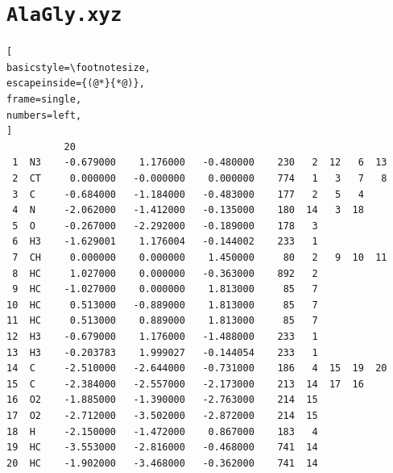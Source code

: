\documentclass[a4paper,11pt]{scrartcl}
\begin{document}
\printbibliography

\newpage

\appendix
\section{\texttt{AlaGly.xyz}}
\label{app:alaglytinker}
\begin{lstlisting}[
basicstyle=\footnotesize,
escapeinside={(@*}{*@)},
frame=single,
numbers=left,
]
          20  
 1  N3    -0.679000    1.176000   -0.480000    230   2  12   6  13
 2  CT     0.000000   -0.000000    0.000000    774   1   3   7   8
 3  C     -0.684000   -1.184000   -0.483000    177   2   5   4
 4  N     -2.062000   -1.412000   -0.135000    180  14   3  18
 5  O     -0.267000   -2.292000   -0.189000    178   3
 6  H3    -1.629001    1.176004   -0.144002    233   1
 7  CH     0.000000    0.000000    1.450000     80   2   9  10  11
 8  HC     1.027000    0.000000   -0.363000    892   2
 9  HC    -1.027000    0.000000    1.813000     85   7
10  HC     0.513000   -0.889000    1.813000     85   7
11  HC     0.513000    0.889000    1.813000     85   7
12  H3    -0.679000    1.176000   -1.488000    233   1
13  H3    -0.203783    1.999027   -0.144054    233   1
14  C     -2.510000   -2.644000   -0.731000    186   4  15  19  20
15  C     -2.384000   -2.557000   -2.173000    213  14  17  16
16  O2    -1.885000   -1.390000   -2.763000    214  15
17  O2    -2.712000   -3.502000   -2.872000    214  15
18  H     -2.150000   -1.472000    0.867000    183   4
19  HC    -3.553000   -2.816000   -0.468000    741  14
20  HC    -1.902000   -3.468000   -0.362000    741  14
\end{lstlisting}
\end{document}
